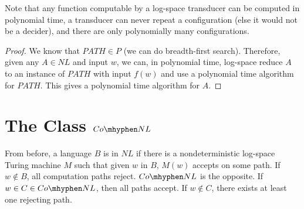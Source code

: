 Note that any function computable by a log-space transducer can be computed in polynomial time, a transducer can never repeat a configuration (else it would not be a decider), and there are only polynomially many configurations.


\begin{proof}
	We know that $PATH \in P$ (we can do breadth-first search). Therefore, given any $A\in NL$ and input $w$, we can, in polynomial time, log-space reduce $A$ to an instance of $PATH$ with input $f(w)$ and use a polynomial time algorithm for $PATH$.  This gives a polynomial time algorithm for $A$.
\end{proof}
	



\section*{The Class $Co\mhyphen NL$}


From before, a language $B$ is in $NL$ if there is a nondeterministic log-space Turing machine $M$ such that given $w$ in $B$, $M(w)$ accepts on some path.  If $w\notin B$, all computation paths reject.  $Co\mhyphen NL$ is the opposite.  If $w\in C\in Co\mhyphen NL$, then all paths accept.  If $w\notin C$, there exists at least one rejecting path.



